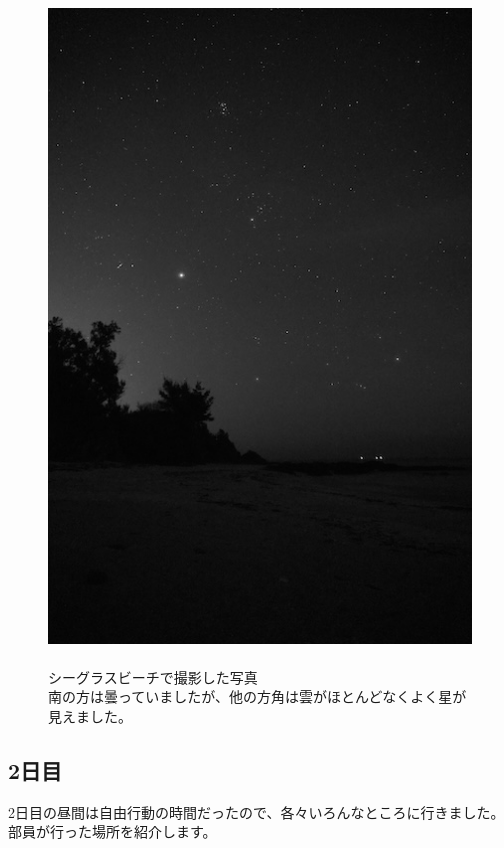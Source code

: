 \documentclass[../main]{subfiles}
\begin{document}
\begin{figure}[H]
  \begin{minipage}[b]{0.48\columnwidth}
    \caption{\\
    シーグラスビーチで撮影した写真\\
    南の方は曇っていましたが、他の方角は雲がほとんどなくよく星が見えました。
    }
  \end{minipage}\hspace{0.04\columnwidth}\begin{minipage}[b]{0.48\columnwidth}
    \centering
    \includegraphics[width=0.7\columnwidth]{figure/1nitimeyoru.jpg}
  \end{minipage}
\end{figure}


\subsection{2日目}
2日目の昼間は自由行動の時間だったので、各々いろんなところに行きました。部員が行った場所を紹介します。\\
\end{document}
